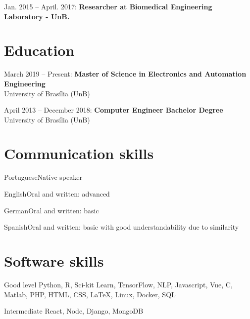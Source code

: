 \documentclass{tccv_full}
\begin{document}
	{\large Jan. 2015 -- April. 2017: \textbf{Researcher at Biomedical Engineering Laboratory - UnB.} \\	
	
	
\section{Education}

	{March 2019 -- Present}: \textbf{Master of Science in Electronics and Automation Engineering}\\
	{University of Bras\'ilia (UnB)}\\	
	
	
	\vspace{0.5cm}
	


	{April 2013 -- December 2018}: \textbf{Computer Engineer Bachelor Degree}\\
	{University of Bras\'ilia (UnB)}\\
	
	


\section{Communication skills}

\begin{factlist}
\item{Portuguese}{Native speaker}
\item{English}{Oral and written: advanced}
\item{German}{Oral and written: basic}
\item{Spanish}{Oral and written: basic with good understandability due to similarity}
\end{factlist}

\section{Software skills}

\begin{factlist}

\item{Good level}
     {Python, R, Sci-kit Learn, TensorFlow, NLP, Javascript, Vue, C, Matlab, PHP, HTML, CSS, \LaTeX, Linux, Docker, SQL}

\item{Intermediate}
     { React, Node, Django, MongoDB}



\end{factlist}
}
\end{document}
